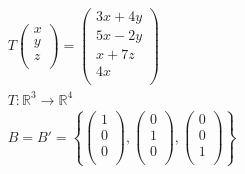 \documentclass[fleqn, a4paper]{amsart}
\theoremstyle{definition}
\theoremstyle{theorem}
\theoremstyle{remark}
\numberwithin{corollary}{theorem}
\numberwithin{equation}{theorem}
\begin{document}
\begin{multicols}{1}
\begin{gather*}
	T 
		\begin{pmatrix}
			x\\
			y\\
			z\\
		\end{pmatrix}
	=
		\begin{pmatrix}
			3x + 4y\\
			5x - 2y\\
			x + 7z\\
			4x\\
		\end{pmatrix}\\
	T : \mathbb{R}^3 \to \mathbb{R}^4\\
	B = B' = 
		\left\lbrace
			\begin{pmatrix}
				1\\
				0\\
				0\\
			\end{pmatrix}
		,
			\begin{pmatrix}
				0\\
				1\\
				0\\
			\end{pmatrix}
		,
			\begin{pmatrix}
				0\\
				0\\
				1\\
			\end{pmatrix}
		\right\rbrace
\end{gather*}

\subsubsection{}


\end{multicols}
\end{document}
